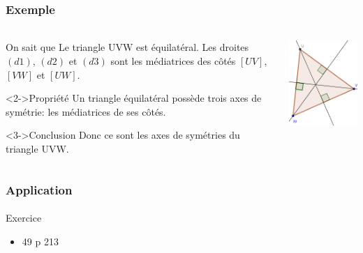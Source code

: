 \documentclass[xcolor={dvipsnames}]{beamer}
\begin{document}
\begin{frame}
	\frametitle{Exemple}  
	\framesubtitle{}
	
	\begin{columns}[c]
		
		
		\begin{column}{7.5cm}
			
			\begin{block}{On sait que}
				Le triangle UVW est équilatéral. Les droites $(d1)$, $(d2)$ et $(d3)$ sont les médiatrices des côtés $[UV]$, $[VW]$ et $[UW]$.
			\end{block}
			
			\begin{block}<2->{Propriété}
				Un triangle équilatéral possède trois axes de symétrie: les médiatrices de ses côtés.
			\end{block}
			
			\begin{block}<3->{Conclusion}
				Donc ce sont les axes de symétries du triangle UVW.
			\end{block}
			
		\end{column}
		
		\begin{column}{3cm}
			\includegraphics[scale=0.5]{./img/equilat}
		\end{column}
		
	\end{columns}
	
\end{frame}

\begin{frame}
	\frametitle{Application}  
	\framesubtitle{}
	
	\begin{block}{Exercice}
		\begin{itemize}
			\item 49 p 213
		\end{itemize}
	\end{block}
\end{frame}
\end{document}
